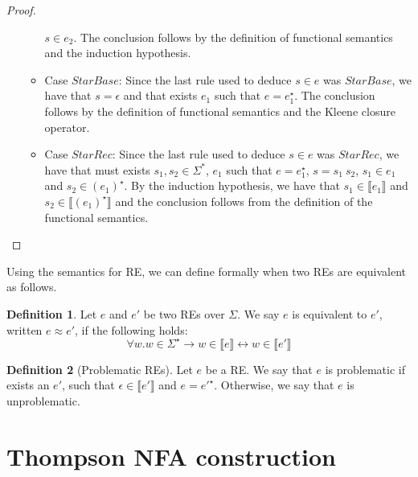 \documentclass[oneside,12pt]{scrbook}
\theoremstyle{definition}
\newcommand{\sembrackets}[1]{\ensuremath{\llbracket #1 \rrbracket}}
\theoremstyle{plain}
\theoremstyle{definition}
\newtheorem{Definition}{Definition}
\begin{document}
\begin{proof}
\begin{itemize}
\begin{itemize}
			$s \in e_2$. The conclusion follows by the definition of functional semantics and the induction hypothesis.
			\item Case $StarBase$: Since the last rule used to deduce $s \in e$ was $StarBase$, we have that $s = \epsilon$ and that exists $e_1$ such that
			$e = e_1^\star$. The conclusion follows by the definition of functional semantics and the Kleene closure operator.
			\item Case $StarRec$: Since the last rule used to deduce $s \in e$ was $StarRec$, we have that must exists $s_1,s_2 \in \Sigma^*$, $e_1$ such
			that $e = e_1^\star$, $s = s_1\:s_2$, $s_1 \in e_1$ and $s_2 \in (e_1)^\star$. By the induction hypothesis, we have that
			$s_1 \in\sembrackets{e_1}$ and $s_2\in\sembrackets{(e_1)^\star}$ and the conclusion follows from the definition of the functional semantics.
		\end{itemize}
	\end{itemize}
\end{proof}


Using the semantics for RE, we can define formally when two REs are equivalent as follows.

\begin{Definition}
	Let $e$ and $e'$ be two REs over $\Sigma$. We say $e$ is equivalent to $e'$, written $e \approx e'$, if the following holds:
	\[
	\forall w. w \in \Sigma^\star \to w \in \sembrackets{e} \leftrightarrow w \in \sembrackets{e'} 
	\]
\end{Definition}

\begin{Definition}[Problematic REs]
	Let $e$ be a RE. We say that $e$ is problematic if exists an $e'$, such that $\epsilon\in\sembrackets{e'}$ and $e = e'^\star$. Otherwise, we say that $e$ is unproblematic.
\end{Definition}

\section{Thompson NFA construction}
\label{section:thompsonconstruction}
\end{document}

